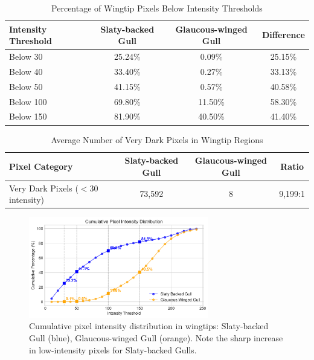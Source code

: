 \documentclass[a4paper,12pt]{report}
\begin{document}
\begin{table}[H]
    \centering
    \caption{Percentage of Wingtip Pixels Below Intensity Thresholds}
    \label{tab:darkthresh}
    \begin{tabular}{lccc}
        \toprule
        Intensity Threshold & Slaty-backed Gull & Glaucous-winged Gull & Difference \\
        \midrule
        Below 30   & 25.24\% & 0.09\% & 25.15\% \\
        Below 40   & 33.40\% & 0.27\% & 33.13\% \\
        Below 50   & 41.15\% & 0.57\% & 40.58\% \\
        Below 100  & 69.80\% & 11.50\% & 58.30\% \\
        Below 150  & 81.90\% & 40.50\% & 41.40\% \\
        \bottomrule
    \end{tabular}
\end{table}

\begin{table}[H]
    \centering
    \caption{Average Number of Very Dark Pixels in Wingtip Regions}
    \label{tab:darkpixelcount}
    \begin{tabular}{lccc}
        \toprule
        Pixel Category & Slaty-backed Gull & Glaucous-winged Gull & Ratio \\
        \midrule
        Very Dark Pixels ($<$30 intensity) & 73,592 & 8 & 9,199:1 \\
        \bottomrule
    \end{tabular}
\end{table}

\begin{figure}[H]
    \centering
    \includegraphics[width=0.7\textwidth]{images/REPORT_IMAGES_INTENSITY/I2/CUMULATIVE.png}
    \caption{Cumulative pixel intensity distribution in wingtips: Slaty-backed Gull (blue), Glaucous-winged Gull (orange). Note the sharp increase in low-intensity pixels for Slaty-backed Gulls.}
    \label{fig:cumulative_dist}
\end{figure}
\end{document}
